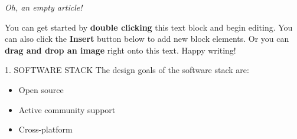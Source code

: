 \textit{Oh, an empty article!} 

You can get started by \textbf{double clicking} this text block and begin editing. You can also click the \textbf{Insert} button below to add new block elements. Or you can \textbf{drag and drop an image} right onto this text. Happy writing!

1. SOFTWARE STACK
The design goals of the software stack are:
\begin{itemize}
\item Open source
\item Active community support
\item Cross-platform
\end{itemize}

